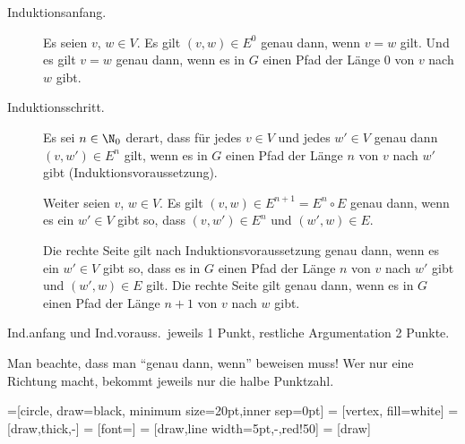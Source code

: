 \documentclass[12pt]{article}
\begin{document}
\begin{loesung}
  \begin{description}
    \item[Induktionsanfang.] Es seien $v$, $w \in V$. Es gilt $(v, w) \in E^0$ genau dann, wenn $v = w$ gilt. Und es gilt $v = w$ genau dann, wenn es in $G$ einen Pfad der Länge $0$ von $v$ nach $w$ gibt.
    \item[Induktionsschritt.] Es sei $n \in \N_0$ derart, dass für jedes $v \in V$ und jedes $w' \in V$ genau dann $(v, w') \in E^n$ gilt, wenn es in $G$ einen Pfad der Länge $n$ von $v$ nach $w'$ gibt (Induktionsvoraussetzung). 

Weiter seien $v$, $w \in V$. Es gilt $(v, w) \in E^{n + 1} = E^n \circ E$ genau dann, wenn es ein $w' \in V$ gibt so, dass $(v, w') \in E^n$ und $(w', w) \in E$. 

Die rechte Seite gilt nach Induktionsvoraussetzung genau dann, wenn es ein $w' \in V$ gibt so, dass es in $G$ einen Pfad der Länge $n$ von $v$ nach $w'$ gibt und $(w', w) \in E$ gilt. Die rechte Seite gilt genau dann, wenn es in $G$ einen Pfad der Länge $n + 1$ von $v$ nach $w$ gibt.
  \end{description}

  \begin{korrektur}
    Ind.anfang und Ind.vorauss.~jeweils 1 Punkt, restliche Argumentation 2 Punkte.

    Man beachte, dass man "`genau dann, wenn"' beweisen muss! Wer nur
    eine Richtung macht, bekommt jeweils nur die halbe Punktzahl.
  \end{korrektur}
\end{loesung}



=[circle, draw=black, minimum size=20pt,inner sep=0pt]
 = [vertex, fill=white]
 = [draw,thick,-]
 = [font=\small]
 = [draw,line width=5pt,-,red!50]
 = [draw]
\end{document}

